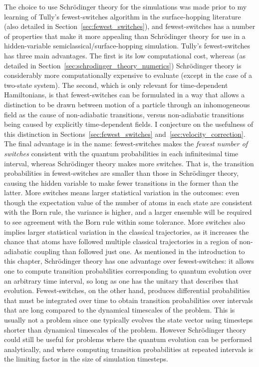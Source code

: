 The choice to use Schr\"odinger theory for the simulations was made prior to my learning of Tully's fewest-switches algorithm in the surface-hopping literature~\cite{doi:10.1063/1.459170, doi:10.1146/annurev-physchem-040215-112245, doi:10.1063/1.2715585} (also detailed in Section~\ref{sec:fewest_switches}), and fewest-switches has a number of properties that make it more appealing than Schr\"odinger theory for use in a hidden-variable semiclassical/surface-hopping simulation. Tully's fewest-switches has three main advantages. The first is its low computational cost, whereas (as detailed in Section~\ref{sec:schrodinger_theory_numerics}) Schr\"odinger theory is considerably more computationally expensive to evaluate (except in the case of a two-state system). The second, which is only relevant for time-dependent Hamiltonians, is that fewest-switches can be formulated in a way that allows a distinction to be drawn between motion of a particle through an inhomogeneous field as the cause of non-adiabatic transitions, versus non-adiabatic transitions being caused by explicitly time-dependent fields. I conjecture on the usefulness of this distinction in Sections~\ref{sec:fewest_switches} and~\ref{sec:velocity_correction}. The final advantage is in the name: fewest-switches makes the \emph{fewest number of switches} consistent with the quantum probabilities in each infinitesimal time interval, whereas Schr\"odinger theory makes more switches. That is, the transition probabilities in fewest-switches are smaller than those in Schr\"odinger theory, causing the hidden variable to make fewer transitions in the former than the latter. More switches means larger statistical variation in the outcomes: even though the expectation value of the number of atoms in each state are consistent with the Born rule, the variance is higher, and a larger ensemble will be required to see agreement with the Born rule within some tolerance. More switches also implies larger statistical variation in the classical trajectories, as it increases the chance that atoms have followed multiple classical trajectories in a region of non-adiabatic coupling than followed just one. As mentioned in the introduction to this chapter, Schr\"odinger theory has one advantage over fewest-switches: it allows one to compute transition probabilities corresponding to quantum evolution over an arbitrary time interval, so long as one has the unitary that describes that evolution. Fewest-switches, on the other hand, produces differential probabilities that must be integrated over time to obtain transition probabilities over intervals that are long compared to the dynamical timescales of the problem. This is usually not a problem since one typically evolves the state vector using timesteps shorter than dynamical timescales of the problem. However Schr\"odinger theory could still be useful for problems where the quantum evolution can be performed analytically, and where computing transition probabilities at repeated intervals is the limiting factor in the size of simulation timesteps.

